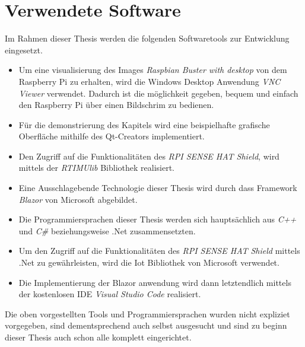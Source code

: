 \section{Verwendete Software}
\label{sec:verwendeteSoftware}
Im Rahmen dieser Thesis werden die folgenden Softwaretools zur Entwicklung eingesetzt.
\begin{itemize}
    \item Um eine visualisierung des Images \emph{Raspbian Buster with desktop} von dem Raspberry
    Pi zu erhalten, wird die Windows Desktop Anwendung \emph{VNC Viewer} verwendet. Dadurch ist
    die möglichkeit gegeben, bequem und einfach den Raspberry Pi über einen Bildschrim zu bedienen.
    \item Für die demonstrierung des Kapitels \emph{} wird eine
    beispielhafte grafische Oberfläche mithilfe des Qt-Creators implementiert.
    \item Den Zugriff auf die Funktionalitäten des \emph{RPI SENSE HAT Shield}, wird mittels der
    \emph{RTIMUlib} Bibliothek realisiert.
    \item Eine Ausschlagebende Technologie dieser Thesis wird durch dass Framework \emph{Blazor}
    von Microsoft abgebildet.
    \item Die Programmiersprachen dieser Thesis werden sich hauptsächlich aus \emph{C++} und
    \emph{C\#} beziehungsweise .Net zusammensetzten.
    \item Um den Zugriff auf die Funktionalitäten des \emph{RPI SENSE HAT Shield} mittels .Net zu
    gewährleisten, wird die Iot Bibliothek von Microsoft verwendet.
    \item Die Implementierung der Blazor anwendung wird dann letztendlich mittels der kostenlosen
    IDE \emph{Visual Studio Code} realisiert.
\end{itemize}

Die oben vorgestellten Tools und Programmiersprachen wurden nicht expliziet vorgegeben, sind
dementsprechend auch selbst ausgesucht und sind zu beginn dieser Thesis auch schon alle komplett
eingerichtet.